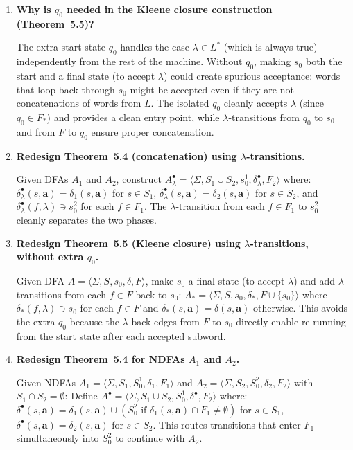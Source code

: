 \begin{enumerate}[{5.}1. ]
\textbf{No.}  The superset $\Sigma^*$ is always in $\NSIG$, but arbitrary supersets need not be.  (The class $\NSIG$ is generally not closed under taking supersets.)

\item \textbf{Why is $q_0$ needed in the Kleene closure construction (Theorem~5.5)?}

The extra start state $q_0$ handles the case $\lambda\in L^*$ (which is always true) independently from the rest of the machine.  Without $q_0$, making $s_0$ both the start and a final state (to accept $\lambda$) could create spurious acceptance: words that loop back through $s_0$ might be accepted even if they are not concatenations of words from $L$.  The isolated $q_0$ cleanly accepts $\lambda$ (since $q_0\in F_*$) and provides a clean entry point, while $\lambda$-transitions from $q_0$ to $s_0$ and from $F$ to $q_0$ ensure proper concatenation.

\item \textbf{Redesign Theorem~5.4 (concatenation) using $\lambda$-transitions.}

Given DFAs $A_1$ and $A_2$, construct $A^\bullet_\lambda=\langle\Sigma,S_1\cup S_2,s^1_0,\delta^\bullet_\lambda,F_2\rangle$ where:
$\delta^\bullet_\lambda(s,\pmb{a})=\delta_1(s,\pmb{a})$ for $s\in S_1$,
$\delta^\bullet_\lambda(s,\pmb{a})=\delta_2(s,\pmb{a})$ for $s\in S_2$, and
$\delta^\bullet_\lambda(f,\lambda)\ni s^2_0$ for each $f\in F_1$.
The $\lambda$-transition from each $f\in F_1$ to $s^2_0$ cleanly separates the two phases.

\item \textbf{Redesign Theorem~5.5 (Kleene closure) using $\lambda$-transitions, without extra $q_0$.}

Given DFA $A=\langle\Sigma,S,s_0,\delta,F\rangle$, make $s_0$ a final state (to accept $\lambda$) and add $\lambda$-transitions from each $f\in F$ back to $s_0$:
$A_*=\langle\Sigma,S,s_0,\delta_*,F\cup\{s_0\}\rangle$ where $\delta_*(f,\lambda)\ni s_0$ for each $f\in F$ and $\delta_*(s,\pmb{a})=\delta(s,\pmb{a})$ otherwise.
This avoids the extra $q_0$ because the $\lambda$-back-edges from $F$ to $s_0$ directly enable re-running from the start state after each accepted subword.

\item \textbf{Redesign Theorem~5.4 for NDFAs $A_1$ and $A_2$.}

Given NDFAs $A_1=\langle\Sigma,S_1,S^1_0,\delta_1,F_1\rangle$ and $A_2=\langle\Sigma,S_2,S^2_0,\delta_2,F_2\rangle$ with $S_1\cap S_2=\emptyset$:
Define $A^\bullet=\langle\Sigma,S_1\cup S_2,S^1_0,\delta^\bullet,F_2\rangle$ where:
$\delta^\bullet(s,\pmb{a})=\delta_1(s,\pmb{a})\cup(S^2_0\text{ if }\delta_1(s,\pmb{a})\cap F_1\neq\emptyset)$ for $s\in S_1$,
$\delta^\bullet(s,\pmb{a})=\delta_2(s,\pmb{a})$ for $s\in S_2$.
This routes transitions that enter $F_1$ simultaneously into $S^2_0$ to continue with $A_2$.


\end{enumerate}
